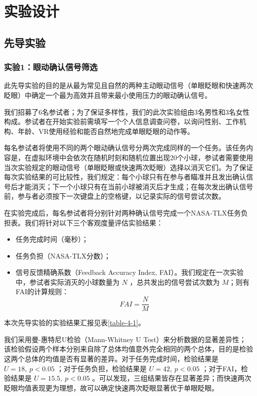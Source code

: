 \chapter{实验设计}

\section{先导实验}

\subsection{实验1：眼动确认信号筛选}
\label{pilot-study-1}

此先导实验的目的是从最为常见且自然的两种主动眼动信号（单眼眨眼和快速两次眨眼）中确定一个最为高效并且带来最小使用压力的眼动确认信号。

我们招募了6名参试者；为了保证多样性，我们的此次实验组由3名男性和3名女性构成。参试者在开始实验前需填写一个个人信息调查问卷，以询问性别、工作机构、年龄、VR使用经验和能否自然地完成单眼眨眼的动作等。

每名参试者将使用不同的两个眼动确认信号分两次完成同样的一个任务。该任务内容是，在虚拟环境中会依次在随机时刻和随机位置出现20个小球，参试者需要使用当次实验规定的眼动信号（单眼眨眼或快速两次眨眼）选择以消灭它们。为了保证每次实验结果的可比较性，我们规定：每个小球只有在参与者瞄准并且发出确认信号后才能消灭；下一个小球只有在当前小球被消灭后才生成；在每次发出确认信号前，参与者必须按下一次键盘上的空格键，以记录实际的信号尝试次数。

在实验完成后，每名参试者将分别针对两种确认信号完成一个NASA-TLX任务负担表。我们将针对以下三个客观度量评估实验结果：

\begin{itemize}[wide]
	\item 任务完成时间（毫秒）；
	\item 任务负担（NASA-TLX分数）；
	\item 信号反馈精确系数（Feedback Accuracy Index, FAI）。我们规定在一次实验中，参试者实际消灭的小球数量为 $N$ ，总共发出的信号尝试次数为 $M$；则有FAI的计算规则：
	\begin{equation}
	FAI = \frac{N}{M}
	\label{formula-4-1}
	\end{equation}
\end{itemize}

本次先导实验的实验结果汇报见表\ref{table-4-1}。

我们采用曼-惠特尼U检验（Mann-Whitney U Test）来分析数据的显著差异性；该检验假设两个样本分别来自除了总体均值意外完全相同的两个总体，目的是检验这两个总体的均值是否有显著的差异。对于任务完成时间，检验结果是 $U = 18,\ p < 0.05$ ；对于任务负担，检验结果是 $U = 42,\ p < 0.05$ ；对于FAI，检验结果是 $U = 15.5,\ p < 0.05$ 。可以发现，三组结果皆存在显著差异；而快速两次眨眼均值表现更为理想，故可以确定快速两次眨眼显著优于单眼眨眼。

